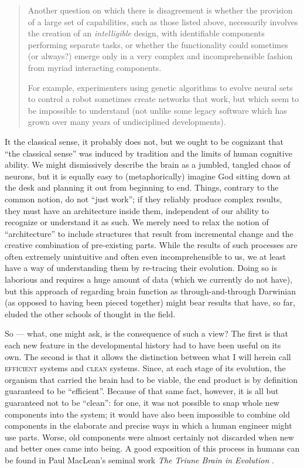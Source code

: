 \begin{quotation}
	Another question on which there is disagreement is whether the provision of a large set of capabilities, such as those listed above, necessarily involves the creation of an {\em intelligible} design, with identifiable components performing separate tasks, or whether the functionality could sometimes (or always?) emerge only in a very complex and incomprehensible fashion from myriad interacting components.
	
	For example, experimenters using genetic algorithms to evolve neural sets to control a robot sometimes create networks that work, but which seem to be impossible to understand (not unlike some legacy software which has grown over many years of undisciplined developments).
\end{quotation}

It the classical sense, it probably does not, but we ought to be cognizant that ``the classical sense'' was induced by tradition and the limits of human cognitive ability. We might dismissively describe the brain as a jumbled, tangled chaos of neurons, but it is equally easy to (metaphorically) imagine God sitting down at the desk and planning it out from beginning to end. Things, contrary to the common notion, do not ``just work''; if they reliably produce complex results, they must have an architecture inside them, independent of our ability to recognize or understand it as such. We merely need to relax the notion of ``architecture'' to include structures that result from incremental change and the creative combination of pre-existing parts. While the results of such processes are often extremely unintuitive and often even incomprehensible to us, we at least have a way of understanding them by re-tracing their evolution. Doing so is laborious and requires a huge amount of data (which we currently do not have), but this approach of regarding brain function as through-and-through Darwinian (as opposed to having been pieced together) might bear results that have, so far, eluded the other schools of thought in the field.

So --- what, one might ask, is the consequence of such a view? The first is that each new feature in the developmental history had to have been useful on its own. The second is that it allows the distinction between what I will herein call \textsc{efficient} systems and \textsc{clean} systems. Since, at each stage of its evolution, the organism that carried the brain had to be viable, the end product is by definition guaranteed to be ``efficient''. Because of that same fact, however, it is all but guaranteed not to be ``clean'': for one, it was not possible to snap whole new components into the system; it would have also been impossible to combine old components in the elaborate and precise ways in which a human engineer might use parts. Worse, old components were almost certainly not discarded when new and better ones came into being. A good exposition of this process in humans can be found in Paul MacLean's seminal work {\em The Triune Brain in Evolution} \cite{maclean1990}.


